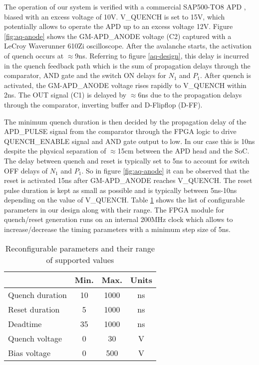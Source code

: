 The operation of our system is verified with a commercial SAP500-TO8 APD \cite{sap500}, biased with an excess voltage of 10V. V\_QUENCH is set to 15V, which potentially allows to operate the APD up to an excess voltage 12V. Figure \ref{fig:aq-anode} shows the GM-APD\_ANODE voltage (C2) captured with a LeCroy Waverunner 610Zi oscilloscope. After the avalanche starts, the activation of quench occurs at $\approx$9ns. Referring to figure \ref{aq-design}, this delay is incurred in the quench feedback path which is the sum of propagation delays through the comparator, AND gate and the switch ON delays for $N_1$ and $P_1$. After quench is activated, the GM-APD\_ANODE voltage rises rapidly to V\_QUENCH within 2ns. The OUT signal (C1) is delayed by $\approx$6ns due to the propagation delays through the comparator, inverting buffer and D-Flipflop (D-FF). 

The minimum quench duration is then decided by the propagation delay of the APD\_PULSE signal from the comparator through the FPGA logic to drive QUENCH\_ENABLE signal and AND gate output to low. In our case this is 10ns despite the physical separation of $\approx$15cm between the APD head and the SoC. The delay between quench and reset is typically set to 5ns to account for switch OFF delays of $N_1$ and $P_1$. So in figure \ref{fig:aq-anode} it can be observed that the reset is activated 15ns after GM-APD\_ANODE reaches V\_QUENCH. The reset pulse duration is kept as small as possible and is typically between 5ns-10ns depending on the value of V\_QUENCH. Table \ref{tab:reconfig-param} shows the list of configurable parameters in our design along with their range. The FPGA module for quench/reset generation runs on an internal 200MHz clock which allows to increase/decrease the timing parameters with a minimum step size of 5ns.
\begin{table}[ht]
\caption{Reconfigurable parameters and their range of supported values} 
\label{tab:reconfig-param}
\begin{center}       
\begin{tabular}{|l|c|c|c|}
\hline
\rule[-1ex]{0pt}{3.5ex}  & Min. & Max. & Units \\
\hline
\rule[-1ex]{0pt}{3.5ex} Quench duration & 10 & 1000 & ns  \\
\hline
\rule[-1ex]{0pt}{3.5ex} Reset duration & 5 & 1000 & ns  \\
\hline
\rule[-1ex]{0pt}{3.5ex} Deadtime & 35 & 1000 & ns  \\
\hline
\rule[-1ex]{0pt}{3.5ex} Quench voltage & 0 & 30 & V  \\
\hline
\rule[-1ex]{0pt}{3.5ex} Bias voltage & 0 & 500 & V  \\
\hline 
\end{tabular}
\end{center}
\end{table}
